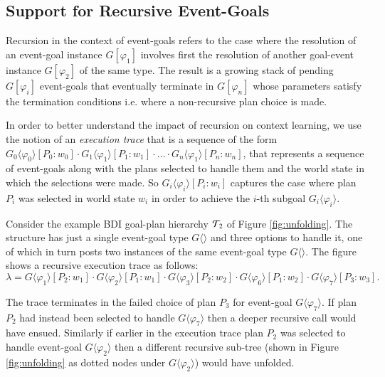 \subsection{Support for Recursive Event-Goals}

Recursion in the context of event-goals refers to the case where the resolution of an event-goal instance $G[\varphi_1]$ involves first the resolution of another goal-event instance $G[\varphi_2]$ of the same type. The result is a growing stack of pending $G[\varphi_i]$ event-goals that eventually terminate in $G[\varphi_n]$ whose parameters satisfy the termination conditions i.e. where a non-recursive plan choice is made.

In order to better understand the impact of recursion on context learning, we use the notion of an \textit{execution trace} that is a sequence of the form $G_0\langle\varphi_0\rangle[P_0:w_0] \cdot G_1\langle\varphi_1\rangle[P_1:w_1] \cdot \ldots \cdot G_n\langle\varphi_1\rangle[P_n:w_n]$, that represents a sequence of event-goals along with the plans selected to handle them and the world state in which the selections were made. So $G_i\langle\varphi_i\rangle[P_i:w_i]$ captures the case where plan $P_i$ was selected in world state $w_i$ in order to achieve the $i$-th subgoal $G_i\langle\varphi_i\rangle$.

Consider the example BDI goal-plan hierarchy ${\mathcal{T}}_2$ of Figure \ref{fig:unfolding}. The structure has just a single event-goal type $G\langle\rangle$ and three options to handle it, one of which in turn posts two instances of the same event-goal type $G\langle\rangle$. The figure shows a recursive execution trace as follows: \[
\lambda=G\langle\varphi_1\rangle[P_2:w_1] \cdot G\langle\varphi_2\rangle[P_1:w_1] \cdot G\langle\varphi_3\rangle[P_2:w_2] \cdot G\langle\varphi_6\rangle[P_1:w_2] \cdot G\langle\varphi_7\rangle[P_3:w_3].
\]

The trace terminates in the failed choice of plan $P_3$ for event-goal $G\langle\varphi_7\rangle$. If plan $P_2$ had instead been selected to handle $G\langle\varphi_7\rangle$ then a deeper recursive call would have ensued. Similarly if earlier in the execution trace plan $P_2$ was selected to handle event-goal $G\langle\varphi_2\rangle$ then a different recursive sub-tree (shown in Figure \ref{fig:unfolding} as dotted nodes under $G\langle\varphi_2\rangle$) would have unfolded.

